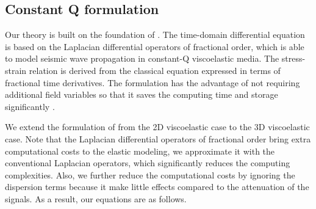 \documentclass{paris17}
\begin{document}


\subsection{Constant Q formulation}

Our theory is built on the foundation of \cite{zhu2014theory}. The time-domain differential equation is based on the Laplacian differential operators of fractional order, which is able to model seismic wave propagation in constant-Q viscoelastic media. The stress-strain relation is derived from the classical equation expressed in terms of fractional time derivatives. The formulation has the advantage of not requiring additional field variables so that it saves the computing time and storage significantly \cite[]{zhu2014theory}.

We extend the formulation of \cite{zhu2014theory} from the 2D viscoelastic case to the 3D viscoelastic case. Note that the Laplacian differential operators of fractional order bring extra computational costs to the elastic modeling, we approximate it with the conventional Laplacian operators, which significantly reduces the computing complexities. Also, we further reduce the computational costs by ignoring the dispersion terms because it make little effects compared to the attenuation of the signals. As a result, our equations are as follows.
\end{document}
